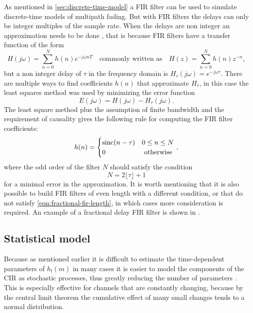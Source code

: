 As mentioned in \ref{sec:discrete-time-model} a FIR filter can be used to simulate discrete-time models of multipath fading. But with FIR filters the delays can only be integer multiples of the sample rate. When the delays are non integer an approximation needs to be done \cite{Valimaki1995}, that is because FIR filters have a transfer function of the form
\begin{equation} \label{eqn:transfer-function-fir}
	H(j\omega) = \sum_{n = 0}^{N} h(n) e^{-j\omega nT}
	\quad \text{commonly written as} \quad
	H(z) = \sum_{n = 0}^{N} h(n) z^{-n},
\end{equation}
but a non integer delay of \(\tau\) in the frequency domain is \(H_\tau(j\omega) = e^{-j\omega \tau}\). There are multiple ways to find coefficients \(h(n)\) that approximate \(H_\tau\), in this case the least squares method was used by minimizing the error function
\begin{equation}
	E(j\omega) = H(j\omega) - H_\tau(j\omega).
\end{equation}
The least square method plus the assumption of finite bandwidth and the requirement of causality gives the following rule for computing the FIR filter coefficients:
\begin{equation}
	h(n)= \begin{cases}
		\operatorname{sinc} (n - \tau) & 0 \leq n \leq N \\ 
		0 & \text { otherwise }
	\end{cases},
\end{equation}
where the odd order of the filter \(N\) should satisfy the condition
\begin{equation} \label{eqn:fractional-fir-length}
	N = 2 \lfloor \tau \rfloor + 1
\end{equation}
for a minimal error in the approximation. It is worth mentioning that it is also possible to build FIR filters of even length with a different condition, or that do not satisfy \eqref{eqn:fractional-fir-length}, in which cases more consideration is required. An example of a fractional delay FIR filter is shown in .

\subsection{Statistical model} \label{sec:statistical-model}

Because as mentioned earlier it is difficult to estimate the time-dependent parameters of \(h_l(m)\) in many cases it is easier to model the components of the CIR as stochastic processes, thus greatly reducing the number of parameters \cite{Messier,Mathis}. This is especially effective for channels that are constantly changing, because by the central limit theorem the cumulative effect of many small changes tends to a normal distribution.

